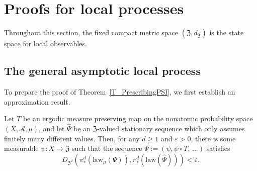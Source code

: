 \documentclass[10pt]{amsart}
\theoremstyle{definition}\newtheorem{defi}[theo]{Definition}\newtheorem{rema}[theo]{Remark}\newtheorem{exam}[theo]{Example}\newtheorem{exem}[theo]{Example}\newtheorem{nota}[theo]{Notation}
\newcommand{\clA}{\mathcal{A}}
\newcommand{\law}{\mathrm{law}}
\newcommand{\frkZ}{\mathfrak{Z}}
\begin{document}
\section{Proofs for local processes}\label{Sec_PfInternalStates}

Throughout this section, the fixed compact metric space $(\frkZ,d_{\frkZ})$ is the state space for local observables.


\subsection{The general asymptotic local process}
To prepare the proof of Theorem~\ref{T_PrescribingPSI}, we first establish an approximation result.

\begin{prop}\label{P_ApproxMarginals}
Let $T$ be an ergodic measure preserving map on the nonatomic probability space $(X,\clA,\mu)$, and let $\widehat{\Psi}$ be an $\frkZ$-valued stationary sequence which only assumes finitely many different values. Then, for any $d\geq1$ and $\varepsilon>0$, there is some measurable $\psi:X\rightarrow\frkZ$ such that the sequence $\Psi:=(\psi,\psi\circ T,\,\ldots)$ satisfies
\begin{equation}
D_{\frkZ^{d}}\left(\pi_{\ast}^{d}\left(\law_{\mu}(\Psi)\right),\pi_{\ast} ^{d}\left(\law\left(\widehat{\Psi}\right)\right)\right)<\varepsilon.
\end{equation}
\end{prop}
\end{document}
